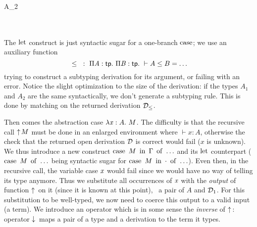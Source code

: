 \documentclass{llncs}
\begin{document}
\begin{mathleft}
  \quad{} \\
  \quad\quad{} {} \\
  \quad\quad{} {} \\
  \quad\quad{} { {A_2}} \\
  \quad\quad
  \match{\md_{\leq}} \\
  \quad\quad\quad{}
   {} \\
  \quad\quad\quad\caseb{\_}
   {}
\end{mathleft}

\noindent
The $\operatorname{let}$ construct is just syntactic sugar for a one-branch
$\operatorname{case}$; we use an auxiliary function $${}\leq{}\ :\ \Pi{\ensuremath{\text{\textit{A}}}}:{\text{\textsf{tp}}}.\  \Pi{\ensuremath{\text{\textit{B}}}}:{\text{\textsf{tp}}}.\  \vdash A\leq B = \ldots$$ trying to
construct a subtyping derivation for its argument, or failing with an
error. Notice the slight optimization to the size of the derivation:
if the types $A_1$ and $A_2$ are the same syntactically, we don't
generate a subtyping rule. This is done by matching on the returned
derivation $\mathcal D_\leq$.

Then comes the abstraction case $\lambda{\ensuremath{\text{\textit{x}}}}:{A}.\  M$. The difficulty is that
the recursive call $\uparrow\!{M}$ must be done in an enlarged
environment where $\vdash x : A$, otherwise the check that the
returned open derivation $\mathcal D$ is correct would fail ($x$ is
unknown). We thus introduce a new construct $\operatorname{case}\ {{M}\ \operatorname{in}\ {\Gamma}}\ \operatorname{of}\  \ldots$
and its $\operatorname{let}$ counterpart ($\operatorname{case}\ {M}\ \operatorname{of}\  \ldots$ being syntactic
sugar for $\operatorname{case}\ {{M}\ \operatorname{in}\ {\cdot}}\ \operatorname{of}\  \ldots$). Even then, in the recursive
call, the variable case $\text{\textit{x}}$ would fail since we would have no way
of telling its type anymore. Thus we substitute all occurrences of
$\text{\textit{x}}$ with the \emph{output} of function $\uparrow\!{}$ on it (since
it is known at this point), \ie\ a pair of $A$ and $\mathcal D_1$. For this
substitution to be well-typed, we now need to coerce this output to a
valid input (a term). We introduce an operator which is in some sense
the \emph{inverse} of $\uparrow\!{}$: operator $\downarrow\!{}$ maps a pair of a
type and a derivation to the term it types.

\begin{mathleft}
  \quad{} \\
  \quad\quad
  {}
\end{mathleft}
\end{document}
